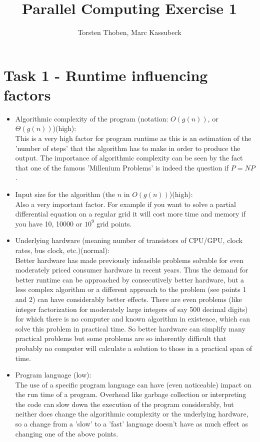 \documentclass[10pt,a4paper]{article}
\title{Parallel Computing Exercise 1}
\date{}
\author{Torsten Thoben, Marc Kassubeck}
\begin{document}
\maketitle

\section{Task 1 - Runtime influencing factors}
\begin{itemize}
\item Algorithmic complexity of the program (notation: $O(g(n))$, or $\Theta(g(n))$)(high):\\
This is a very high factor for program runtime as this is an estimation of the 'number of steps' that the algorithm has to make in order to produce the output. The importance of algorithmic complexity can be seen by the fact that one of the famous 'Millenium Problems' is indeed the question if $P=NP$.

\item Input size for the algorithm (the $n$ in $O(g(n))$)(high):\\
Also a very important factor. For example if you want to solve a partial differential equation on a regular grid it will cost more time and memory if you have 10, 10000 or $10^9$ grid points.

\item Underlying hardware (meaning number of transistors of CPU/GPU, clock rates, bus clock, etc.)(normal):\\
Better hardware has made previously infeasible problems solvable for even moderately priced consumer hardware in recent years. Thus the demand for better runtime can be approached by consecutively better hardware, but a less complex algorithm or a different approach to the problem (see points 1 and 2) can have considerably better effects. There are even problems (like integer factorization for moderately large integers of say 500 decimal digits) for which there is no computer and known algorithm in existence, which can solve this problem in practical time. So better hardware can simplify many practical problems but some problems are so inherently difficult that probably no computer will calculate a solution to those in a practical span of time.

\item Program language (low):\\
The use of a specific program language can have (even noticeable) impact on the run time of a program. Overhead like garbage collection or interpreting the code can slow down the execution of the program considerably, but neither does change the algorithmic complexity or the underlying hardware, so a change from a 'slow' to a 'fast' language doesn't have as much effect as changing one of the above points. 

\end{itemize}
\end{document}
